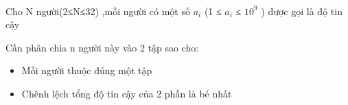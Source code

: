  

Cho N người(2≤N≤32) ,mỗi người có một số $a_{i}$ (1 ≤ $a_{i}$ ≤ $10^{9}$ ) được gọi là độ tin cậy

Cần phân chia n người này vào 2 tập sao cho:
\begin{itemize}
	\item Mỗi người thuộc đúng một tập
	\item Chênh lệch tổng độ tin cậy của 2 phần là bé nhất
\end{itemize}